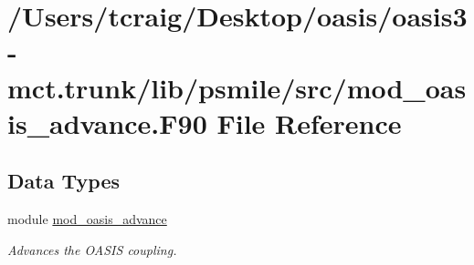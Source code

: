 \hypertarget{mod__oasis__advance_8_f90}{\section{/\+Users/tcraig/\+Desktop/oasis/oasis3-\/mct.trunk/lib/psmile/src/mod\+\_\+oasis\+\_\+advance.F90 File Reference}
\label{mod__oasis__advance_8_f90}
}
\subsection*{Data Types}
\begin{DoxyCompactItemize}
\item 
module \hyperlink{classmod__oasis__advance}{mod\+\_\+oasis\+\_\+advance}
\begin{DoxyCompactList}\small\item\em Advances the O\+A\+S\+I\+S coupling. \end{DoxyCompactList}\end{DoxyCompactItemize}
